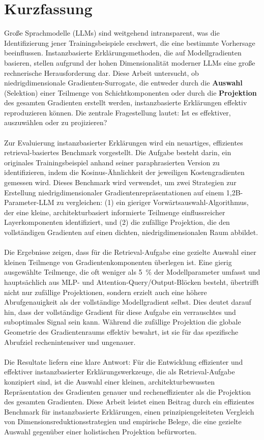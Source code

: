 \chapter{Kurzfassung}
Große Sprachmodelle (LLMs) sind weitgehend intransparent, was die Identifizierung jener Trainingsbeispiele erschwert, die eine bestimmte Vorhersage beeinflussen. Instanzbasierte Erklärungsmethoden, die auf Modellgradienten basieren, stellen aufgrund der hohen Dimensionalität moderner LLMs eine große rechnerische Herausforderung dar. Diese Arbeit untersucht, ob niedrigdimensionale Gradienten-Surrogate, die entweder durch die \textbf{Auswahl} (Selektion) einer Teilmenge von Schichtkomponenten oder durch die \textbf{Projektion} des gesamten Gradienten erstellt werden, instanzbasierte Erklärungen effektiv reproduzieren können. Die zentrale Fragestellung lautet: Ist es effektiver, auszuwählen oder zu projizieren?
\\\\
Zur Evaluierung instanzbasierter Erklärungen wird ein neuartiges, effizientes retrieval-basiertes Benchmark vorgestellt. Die Aufgabe besteht darin, ein originales Trainingsbeispiel anhand seiner paraphrasierten Version zu identifizieren, indem die Kosinus-Ähnlichkeit der jeweiligen Kostengradienten gemessen wird. Dieses Benchmark wird verwendet, um zwei Strategien zur Erstellung niedrigdimensionaler Gradientenrepräsentationen auf einem 1,2B-Parameter-LLM zu vergleichen: (1) ein gieriger Vorwärtsauswahl-Algorithmus, der eine kleine, architekturbasiert informierte Teilmenge einflussreicher Layerkomponenten identifiziert, und (2) die zufällige Projektion, die den vollständigen Gradienten auf einen dichten, niedrigdimensionalen Raum abbildet.
\\\\
Die Ergebnisse zeigen, dass für die Retrieval-Aufgabe eine gezielte Auswahl einer kleinen Teilmenge von Gradientenkomponenten überlegen ist. Eine gierig ausgewählte Teilmenge, die oft weniger als 5~\% der Modellparameter umfasst und hauptsächlich aus MLP- und Attention-Query/Output-Blöcken besteht, übertrifft nicht nur zufällige Projektionen, sondern erzielt auch eine höhere Abrufgenauigkeit als der vollständige Modellgradient selbst. Dies deutet darauf hin, dass der vollständige Gradient für diese Aufgabe ein verrauschtes und suboptimales Signal sein kann. Während die zufällige Projektion die globale Geometrie des Gradientenraums effektiv bewahrt, ist sie für das spezifische Abrufziel rechenintensiver und ungenauer.
\\\\
Die Resultate liefern eine klare Antwort: Für die Entwicklung effizienter und effektiver instanzbasierter Erklärungswerkzeuge, die als Retrieval-Aufgabe konzipiert sind, ist die Auswahl einer kleinen, architekturbewussten Repräsentation des Gradienten genauer und recheneffizienter als die Projektion des gesamten Gradienten. Diese Arbeit leistet einen Beitrag durch ein effizientes Benchmark für instanzbasierte Erklärungen, einen prinzipiengeleiteten Vergleich von Dimensionsreduktionsstrategien und empirische Belege, die eine gezielte Auswahl gegenüber einer holistischen Projektion befürworten.
\clearpage